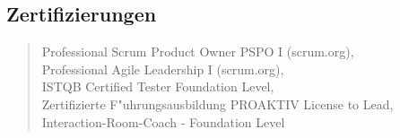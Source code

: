 \subsection*{Zertifizierungen}
%
\begin{quote}
		Professional Scrum Product Owner PSPO I (scrum.org),\\
		Professional Agile Leadership I (scrum.org),\\
		ISTQB Certified Tester Foundation Level,\\
		Zertifizierte F"uhrungsausbildung PROAKTIV License to Lead,\\
		Interaction-Room-Coach - Foundation Level
\end{quote}
